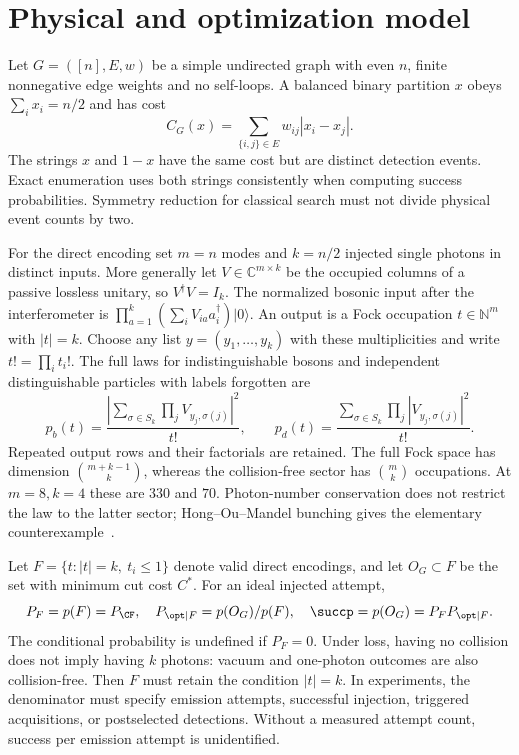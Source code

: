 \section{Physical and optimization model}\label{sec:model}
Let $G=([n],E,w)$ be a simple undirected graph with even $n$, finite nonnegative edge weights and no self-loops. A balanced binary partition $x$ obeys $\sum_i x_i=n/2$ and has cost
\begin{equation}
 C_G(x)=\sum_{\{i,j\}\in E}w_{ij}|x_i-x_j|.\label{eq:cut}
\end{equation}
The strings $x$ and $1-x$ have the same cost but are distinct detection events. Exact enumeration uses both strings consistently when computing success probabilities. Symmetry reduction for classical search must not divide physical event counts by two.

For the direct encoding set $m=n$ modes and $k=n/2$ injected single photons in distinct inputs. More generally let $V\in\mathbb C^{m\times k}$ be the occupied columns of a passive lossless unitary, so $V^\dagger V=I_k$. The normalized bosonic input after the interferometer is $\prod_{a=1}^k(\sum_iV_{ia}a_i^\dagger)|0\rangle$. An output is a Fock occupation $t\in\mathbb N^m$ with $|t|=k$. Choose any list $y=(y_1,\ldots,y_k)$ with these multiplicities and write $t!=\prod_i t_i!$. The full laws for indistinguishable bosons and independent distinguishable particles with labels forgotten are
\begin{equation}
 p_b(t)=\frac{\left|\sum_{\sigma\in S_k}\prod_jV_{y_j,\sigma(j)}\right|^2}{t!},\qquad
 p_d(t)=\frac{\sum_{\sigma\in S_k}\prod_j|V_{y_j,\sigma(j)}|^2}{t!}.\label{eq:laws}
\end{equation}
Repeated output rows and their factorials are retained. The full Fock space has dimension $\binom{m+k-1}{k}$, whereas the collision-free sector has $\binom{m}{k}$ occupations. At $m=8,k=4$ these are $330$ and $70$. Photon-number conservation does not restrict the law to the latter sector; Hong--Ou--Mandel bunching gives the elementary counterexample~\cite{hom1987}.

Let $F=\{t:|t|=k,\ t_i\le1\}$ denote valid direct encodings, and let $O_G\subset F$ be the set with minimum cut cost $C^*$. For an ideal injected attempt,
\begin{equation}
 P_F=p(F)=P_{\CF},\quad P_{\opt\mid F}=p(O_G)/p(F),\quad
 \succp=p(O_G)=P_F P_{\opt\mid F}.\label{eq:success}
\end{equation}
The conditional probability is undefined if $P_F=0$. Under loss, having no collision does not imply having $k$ photons: vacuum and one-photon outcomes are also collision-free. Then $F$ must retain the condition $|t|=k$. In experiments, the denominator must specify emission attempts, successful injection, triggered acquisitions, or postselected detections. Without a measured attempt count, success per emission attempt is unidentified.

